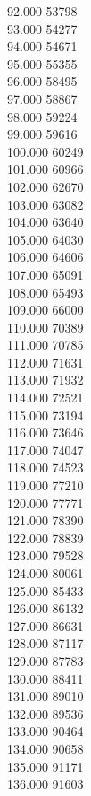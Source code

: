 { 92.000	53798 \\
 93.000	54277 \\
 94.000	54671 \\
 95.000	55355 \\
 96.000	58495 \\
 97.000	58867 \\
 98.000	59224 \\
 99.000	59616 \\
 100.000	60249 \\
 101.000	60966 \\
 102.000	62670 \\
 103.000	63082 \\
 104.000	63640 \\
 105.000	64030 \\
 106.000	64606 \\
 107.000	65091 \\
 108.000	65493 \\
 109.000	66000 \\
 110.000	70389 \\
 111.000	70785 \\
 112.000	71631 \\
 113.000	71932 \\
 114.000	72521 \\
 115.000	73194 \\
 116.000	73646 \\
 117.000	74047 \\
 118.000	74523 \\
 119.000	77210 \\
 120.000	77771 \\
 121.000	78390 \\
 122.000	78839 \\
 123.000	79528 \\
 124.000	80061 \\
 125.000	85433 \\
 126.000	86132 \\
 127.000	86631 \\
 128.000	87117 \\
 129.000	87783 \\
 130.000	88411 \\
 131.000	89010 \\
 132.000	89536 \\
 133.000	90464 \\
 134.000	90658 \\
 135.000	91171 \\
 136.000	91603 \\
}
